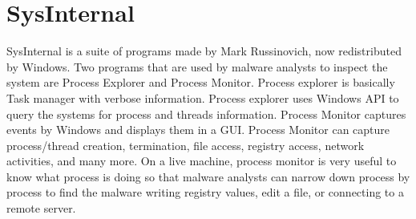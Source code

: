 \section[SysInternal]{SysInternal}

SysInternal \cite{sysinternal} is a suite of programs made by Mark Russinovich,
now redistributed by Windows. Two programs that are used by malware analysts to
inspect the system are Process Explorer and Process Monitor.  Process explorer
is basically Task manager with verbose information. Process explorer uses
Windows API to query the systems for process and threads information.  Process
Monitor captures events by Windows and displays them in a GUI. Process Monitor
can capture process/thread creation, termination, file access, registry access,
network activities, and many more. On a live machine, process monitor is very
useful to know what process is doing so that malware analysts can narrow down
process by process to find the malware writing registry values, edit a file, or
connecting to a remote server.
